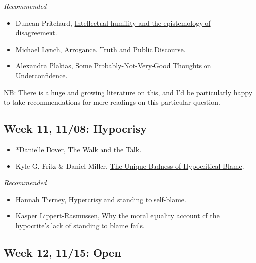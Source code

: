 \documentclass[
]{article}
\providecommand{\tightlist}{%
  \setlength{\itemsep}{0pt}\setlength{\parskip}{0pt}}
\begin{document}
\emph{Recommended}

\begin{itemize}
\tightlist
\item
  Duncan Pritchard,
  \href{https://link-springer-com.proxy.lib.umich.edu/article/10.1007\%2Fs11229-018-02024-5}{Intellectual
  humility and the epistemology of disagreement}.
\item
  Michael Lynch,
  \href{https://www.cambridge.org/core/journals/episteme/article/abs/arrogance-truth-and-public-discourse/EB7618E77489F730D5020C3B88119285}{Arrogance,
  Truth and Public Discourse}.
\item
  Alexandra Plakias,
  \href{https://link.springer.com/article/10.1007/s10677-020-10093-0}{Some
  Probably-Not-Very-Good Thoughts on Underconfidence}.
\end{itemize}

NB: There is a huge and growing literature on this, and I'd be
particularly happy to take recommendations for more readings on this
particular question.

\newpage

\hypertarget{week-11-1108-hypocrisy}{%
\subsection{Week 11, 11/08: Hypocrisy}\label{week-11-1108-hypocrisy}}

\begin{itemize}
\tightlist
\item
  *Danielle Dover, \href{https://doi.org/10.1215/00318108-7697850}{The
  Walk and the Talk}.
\item
  Kyle G. Fritz \& Daniel Miller,
  \href{https://quod.lib.umich.edu/e/ergo/12405314.0006.019/--unique-badness-of-hypocritical-blame?rgn=main;view=fulltext}{The
  Unique Badness of Hypocritical Blame}.
\end{itemize}

\emph{Recommended}

\begin{itemize}
\tightlist
\item
  Hannah Tierney,
  \href{https://doi.org/10.1093/analys/anaa074}{Hypercrisy and standing
  to self-blame}.
\item
  Kasper Lippert-Rasmussen,
  \href{https://doi.org/10.1093/analys/anaa009}{Why the moral equality
  account of the hypocrite's lack of standing to blame fails}.
\end{itemize}

\hypertarget{week-12-1115-open}{%
\subsection{Week 12, 11/15: Open}\label{week-12-1115-open}}
\end{document}
